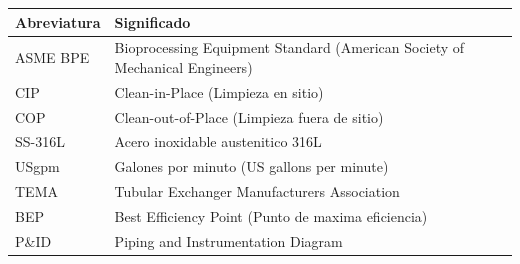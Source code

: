 \begin{tabularx}{\textwidth}{@{}l>{\raggedright\arraybackslash}X@{}}
	\toprule
	\textbf{Abreviatura} & \textbf{Significado} \\
	\midrule
	ASME BPE & Bioprocessing Equipment Standard (American Society of Mechanical Engineers) \\
	CIP & Clean-in-Place (Limpieza en sitio) \\
	COP & Clean-out-of-Place (Limpieza fuera de sitio) \\
	SS-316L & Acero inoxidable austenitico 316L \\
	USgpm & Galones por minuto (US gallons per minute) \\
	TEMA & Tubular Exchanger Manufacturers Association \\
	BEP & Best Efficiency Point (Punto de maxima eficiencia) \\
	P\&ID & Piping and Instrumentation Diagram \\
	\bottomrule
\end{tabularx}

\newpage

